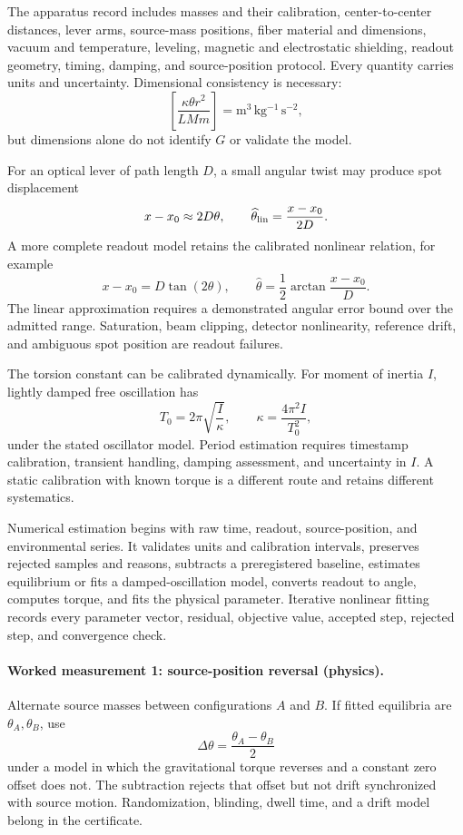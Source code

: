 The apparatus record includes masses and their calibration, center-to-center distances, lever arms, source-mass
positions, fiber material and dimensions, vacuum and temperature, leveling, magnetic and electrostatic shielding,
readout geometry, timing, damping, and source-position protocol.  Every quantity carries units and uncertainty.
Dimensional consistency is necessary:
\[
\left[\frac{\kappa\theta r^2}{LMm}\right]
=\mathrm{m^3\,kg^{-1}\,s^{-2}},
\]
but dimensions alone do not identify \(G\) or validate the model.

For an optical lever of path length \(D\), a small angular twist may produce spot displacement
\[
                         x-x_0\approx2D\theta,
\qquad \widehat\theta_{\rm lin}=\frac{x-x_0}{2D}.
\]
A more complete readout model retains the calibrated nonlinear relation, for example
\[
                         x-x_0=D\tan(2\theta),
\qquad
\widehat\theta=\frac12\arctan\frac{x-x_0}{D}.
\]
The linear approximation requires a demonstrated angular error bound over the admitted range.  Saturation, beam
clipping, detector nonlinearity, reference drift, and ambiguous spot position are readout failures.

The torsion constant can be calibrated dynamically.  For moment of inertia \(I\), lightly damped free oscillation has
\[
                         T_0=2\pi\sqrt{\frac I\kappa},
\qquad
\kappa=\frac{4\pi^2I}{T_0^2},
\]
under the stated oscillator model.  Period estimation requires timestamp calibration, transient handling, damping
assessment, and uncertainty in \(I\).  A static calibration with known torque is a different route and retains
different systematics.

Numerical estimation begins with raw time, readout, source-position, and environmental series.  It validates units
and calibration intervals, preserves rejected samples and reasons, subtracts a preregistered baseline, estimates
equilibrium or fits a damped-oscillation model, converts readout to angle, computes torque, and fits the physical
parameter.  Iterative nonlinear fitting records every parameter vector, residual, objective value, accepted step,
rejected step, and convergence check.

\paragraph{Worked measurement 1: source-position reversal (physics).}
Alternate source masses between configurations \(A\) and \(B\).  If fitted equilibria are
\(\theta_A,\theta_B\), use
\[
                         \Delta\theta=\frac{\theta_A-\theta_B}{2}
\]
under a model in which the gravitational torque reverses and a constant zero offset does not.  The subtraction
rejects that offset but not drift synchronized with source motion.  Randomization, blinding, dwell time, and a drift
model belong in the certificate.

